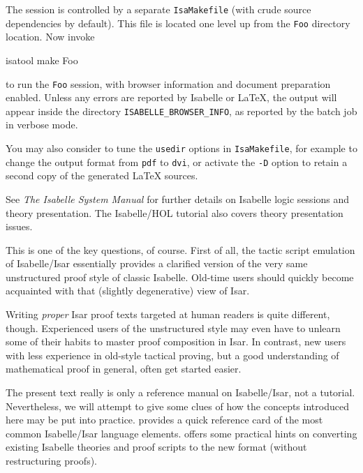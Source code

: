 \begin{isabellebody}
\begin{isamarkuptext}
  The session is controlled by a separate \verb|IsaMakefile|
  (with crude source dependencies by default).  This file is located
  one level up from the \verb|Foo| directory location.  Now
  invoke
\begin{ttbox}
  isatool make Foo
\end{ttbox}
  to run the \verb|Foo| session, with browser information and
  document preparation enabled.  Unless any errors are reported by
  Isabelle or {\LaTeX}, the output will appear inside the directory
  \verb|ISABELLE_BROWSER_INFO|, as reported by the batch job in
  verbose mode.

  \medskip You may also consider to tune the \verb|usedir|
  options in \verb|IsaMakefile|, for example to change the output
  format from \verb|pdf| to \verb|dvi|, or activate the
  \verb|-D| option to retain a second copy of the generated
  {\LaTeX} sources.

  \medskip See \emph{The Isabelle System Manual} \cite{isabelle-sys}
  for further details on Isabelle logic sessions and theory
  presentation.  The Isabelle/HOL tutorial \cite{isabelle-hol-book}
  also covers theory presentation issues.%
\end{isamarkuptext}%
\isamarkuptrue%
%
\isamarkuptrue%
%
\begin{isamarkuptext}%
This is one of the key questions, of course.  First of all, the
  tactic script emulation of Isabelle/Isar essentially provides a
  clarified version of the very same unstructured proof style of
  classic Isabelle.  Old-time users should quickly become acquainted
  with that (slightly degenerative) view of Isar.

  Writing \emph{proper} Isar proof texts targeted at human readers is
  quite different, though.  Experienced users of the unstructured
  style may even have to unlearn some of their habits to master proof
  composition in Isar.  In contrast, new users with less experience in
  old-style tactical proving, but a good understanding of mathematical
  proof in general, often get started easier.

  \medskip The present text really is only a reference manual on
  Isabelle/Isar, not a tutorial.  Nevertheless, we will attempt to
  give some clues of how the concepts introduced here may be put into
  practice.   provides a quick reference card of
  the most common Isabelle/Isar language elements.  
  offers some practical hints on converting existing Isabelle theories
  and proof scripts to the new format (without restructuring proofs).


\end{isamarkuptext}
\end{isabellebody}
